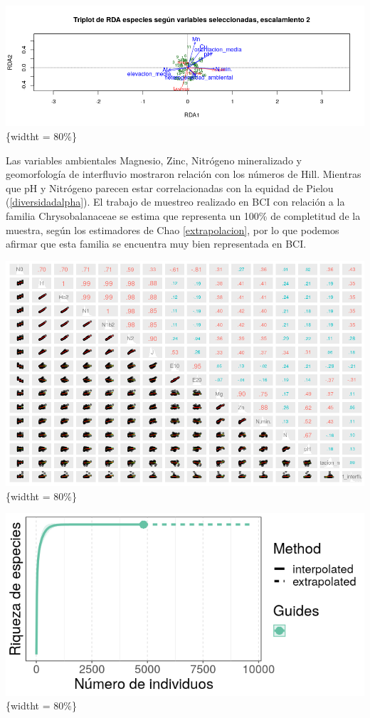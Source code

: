 \documentclass[11pt,]{article}
\begin{document}
\includegraphics{triplotRDA.png}\{widtht = 80\%\}

Las variables ambientales Magnesio, Zinc, Nitrógeno mineralizado y
geomorfología de interfluvio mostraron relación con los números de Hill.
Mientras que pH y Nitrógeno parecen estar correlacionadas con la equidad
de Pielou (\ref{diversidadalpha}). El trabajo de muestreo realizado en
BCI con relación a la familia Chrysobalanaceae se estima que representa
un 100\% de completitud de la muestra, según los estimadores de Chao
\ref{extrapolacion}, por lo que podemos afirmar que esta familia se
encuentra muy bien representada en BCI.

\includegraphics{diversidadalpha.png}\{widtht = 80\%\}

\includegraphics{Extrapolacion_mifamilia.png}\{widtht = 80\%\}
\end{document}
